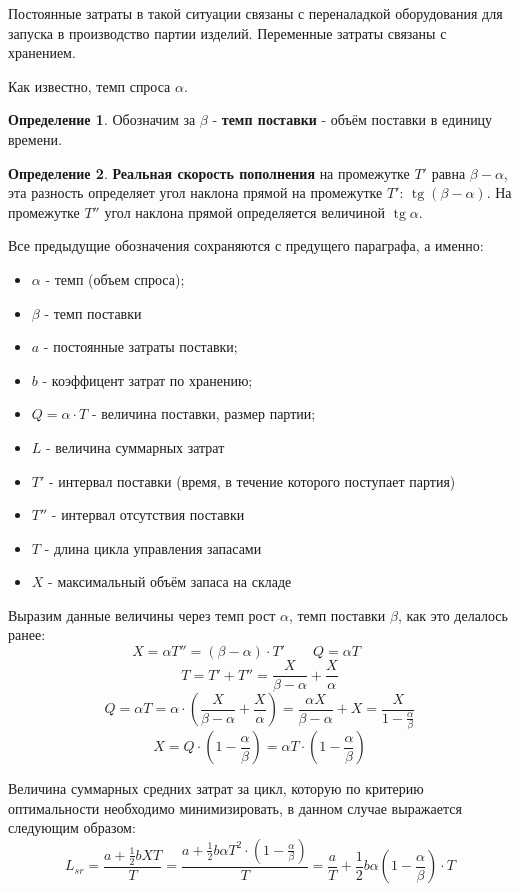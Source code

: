 \documentclass[aps,%
12pt,%
final,%
oneside,
onecolumn,%
musixtex, %
superscriptaddress,%
centertags]{article} %
\theoremstyle{plain}
\theoremstyle{definition}
\newtheorem{definition}{Определение}[subsection]
\theoremstyle{remark}
\begin{document}
Постоянные затраты в такой ситуации связаны с переналадкой оборудования для запуска в производство партии изделий. Переменные затраты связаны с хранением.

Как известно, темп спроса $\alpha$.

\begin{definition}
	Обозначим за $\beta$ - \textbf{темп поставки} - объём поставки в единицу времени. 
\end{definition}

\begin{definition}
	\textbf{Реальная скорость пополнения} на промежутке $T'$ равна $\beta-\alpha$, эта разность определяет угол наклона прямой на промежутке $T'$: $\operatorname{tg} (\beta-\alpha)$. На промежутке $T''$ угол наклона прямой определяется величиной $\operatorname{tg} \alpha$.
\end{definition}

Все предыдущие обозначения сохраняются с предущего параграфа, а именно:
\begin{itemize}
	\item $\alpha$ - темп (объем спроса);
	\item $\beta$ - темп поставки
	\item $a$ - постоянные затраты поставки;
	\item $b$ - коэффицент затрат по хранению;
	\item $Q = \alpha \cdot T$ - величина поставки, размер партии;
	\item $L$ - величина суммарных затрат
	\item $T'$ - интервал поставки (время, в течение которого поступает партия)
	\item $T''$ - интервал отсутствия поставки
	\item $T$ - длина цикла управления запасами
	\item $X$ - максимальный объём запаса на складе
\end{itemize}

Выразим данные величины через темп рост $\alpha$, темп поставки $\beta$, как это делалось ранее:
$$X = \alpha T'' = (\beta-\alpha) \cdot T' \qquad Q = \alpha T \qquad $$
$$T = T' + T'' = \frac{X}{\beta-\alpha} + \frac{X}{\alpha}$$
$$Q = \alpha T = \alpha \cdot \left( \frac{X}{\beta-\alpha} + \frac{X}{\alpha}\right) = \frac{\alpha X}{\beta-\alpha} + X = \frac{X}{1-\frac{\alpha}{\beta}}$$
$$X =Q \cdot \left({1-\frac{\alpha}{\beta}}\right) = \alpha T \cdot \left({1-\frac{\alpha}{\beta}}\right)$$

Величина суммарных средних затрат за цикл, которую по критерию оптимальности необходимо минимизировать, в данном случае выражается следующим образом:
$$L_{sr} = \frac{a+\frac{1}{2}bXT}{T} = \frac{a+\frac{1}{2}b\alpha T^2 \cdot \left({1-\frac{\alpha}{\beta}}\right)}{T} = \frac{a}{T} + \frac{1}{2}b\alpha\left(1 - \frac{\alpha}{\beta} \right) \cdot T$$
\end{document}

